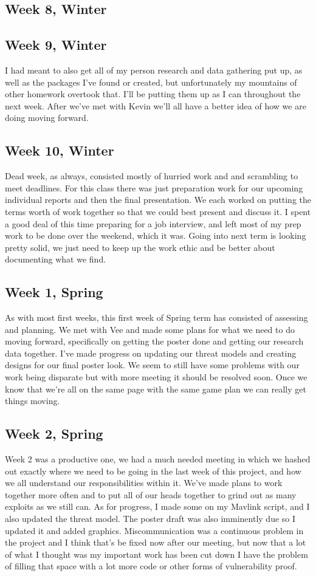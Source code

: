 \subsection{Week 8, Winter}
\subsection{Week 9, Winter}
I had meant to also get all of my person research and data gathering put up, as well as the packages I've found or created, but unfortunately my mountains of other homework overtook that. I'll be putting them up as I can throughout the next week. After we've met with Kevin we'll all have a better idea of how we are doing moving forward.
\subsection{Week 10, Winter}
Dead week, as always, consisted mostly of hurried work and and scrambling to meet deadlines. For this class there was just preparation work for our upcoming individual reports and then the final presentation. We each worked on putting the terms worth of work together so that we could best present and discuss it. I spent a good deal of this time preparing for a job interview, and left most of my prep work to be done over the weekend, which it was. Going into next term is looking pretty solid, we just need to keep up the work ethic and be better about documenting what we find.
\subsection{Week 1, Spring}
As with most first weeks, this first week of Spring term has consisted of assessing and planning. We met with Vee and made some plans for what we need to do moving forward, specifically on getting the poster done and getting our research data together. I've made progress on updating our threat models and creating designs for our final poster look. We seem to still have some problems with our work being disparate but with more meeting it should be resolved soon. Once we know that we're all on the same page with the same game plan we can really get things moving.
\subsection{Week 2, Spring}
Week 2 was a productive one, we had a much needed meeting in which we hashed out exactly where we need to be going in the last week of this project, and how we all understand our responsibilities within it. We've made plans to work together more often and to put all of our heads together to grind out as many exploits as we still can. As for progress, I made some on my Mavlink script, and I also updated the threat model. The poster draft was also imminently due so I updated it and added graphics. Miscommunication was a continuous problem in the project and I think that's be fixed now after our meeting, but now that a lot of what I thought was my important work has been cut down I have the problem of filling that space with a lot more code or other forms of vulnerability proof.

